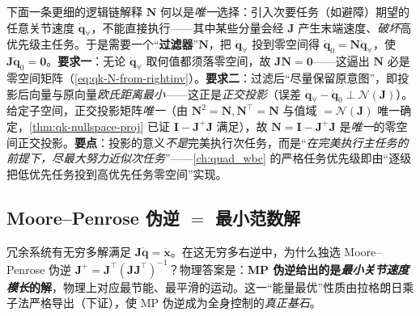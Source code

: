 \begin{note}\label{note:qk-proj-filter}
下面一条更细的逻辑链解释 $\mathbf{N}$ 何以是\emph{唯一}选择\cite{yu2021quadruped}：引入次要任务（如避障）期望的任意关节速度 $\dot{\boldsymbol{q}}_{\forall}$，不能直接执行——其中某些分量会经 $\mathbf{J}$ 产生末端速度、\emph{破坏}高优先级主任务。于是需要一个“\textbf{过滤器}”$\mathbf{N}$，把 $\dot{\boldsymbol{q}}_{\forall}$ 投到零空间得 $\dot{\boldsymbol{q}}_0=\mathbf{N}\dot{\boldsymbol{q}}_{\forall}$，使 $\mathbf{J}\dot{\boldsymbol{q}}_0=\mathbf{0}$。\textbf{要求一}：无论 $\dot{\boldsymbol{q}}_{\forall}$ 取何值都须落零空间，故 $\mathbf{J}\mathbf{N}=\mathbf{0}$——这逼出 $\mathbf{N}$ 必是零空间矩阵（\cref{eq:qk-N-from-rightinv}）。\textbf{要求二}：过滤后“尽量保留原意图”，即投影后向量与原向量\emph{欧氏距离最小}——这正是\emph{正交投影}（误差 $\dot{\boldsymbol{q}}_{\forall}-\dot{\boldsymbol{q}}_0\perp\mathcal{N}(\mathbf{J})$）。给定子空间，正交投影矩阵\emph{唯一}（由 $\mathbf{N}^2=\mathbf{N},\mathbf{N}^\top=\mathbf{N}$ 与值域 $=\mathcal{N}(\mathbf{J})$ 唯一确定，\cref{thm:qk-nullspace-proj} 已证 $\mathbf{I}-\mathbf{J}^{+}\mathbf{J}$ 满足），故 $\mathbf{N}=\mathbf{I}-\mathbf{J}^{+}\mathbf{J}$ 是\emph{唯一}的零空间正交投影。\textbf{要点}：投影的意义\emph{不是}完美执行次任务，而是“\emph{在完美执行主任务的前提下，尽最大努力近似次任务}”——\cref{ch:quad_wbc} 的严格任务优先级即由“逐级把低优先任务投到高优先任务零空间”实现。
\end{note}

\subsection{Moore--Penrose 伪逆 $=$ 最小范数解}
\label{subsec:qk-mp-pinv}

\begin{insight}[K8：MP 伪逆 $=$ 能量最优（全身控制真正基石）]\label{ins:qk-mp-energy}
冗余系统有无穷多解满足 $\mathbf{J}\dot{\boldsymbol{q}}=\dot{\boldsymbol{x}}$。在这无穷多右逆中，为什么独选 Moore--Penrose 伪逆 $\mathbf{J}^{+}=\mathbf{J}^\top(\mathbf{J}\mathbf{J}^\top)^{-1}$？物理答案是：\textbf{MP 伪逆给出的是\emph{最小关节速度模长}的解}，物理上对应最节能、最平滑的运动。这一“能量最优”性质由拉格朗日乘子法严格导出（下证），使 MP 伪逆成为全身控制的\emph{真正基石}。
\end{insight}

